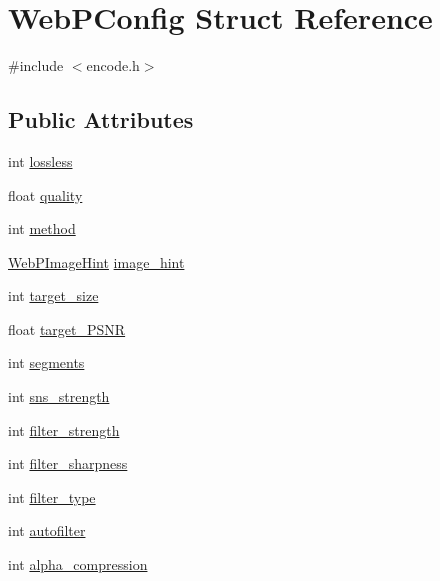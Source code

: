 \hypertarget{struct_web_p_config}{}\section{Web\+P\+Config Struct Reference}
\label{struct_web_p_config}


{\ttfamily \#include $<$encode.\+h$>$}

\subsection*{Public Attributes}
\begin{DoxyCompactItemize}
\item 
int \mbox{\hyperlink{struct_web_p_config_ae76342aafc7e4e4faae98c8b40b4c426}{lossless}}
\item 
float \mbox{\hyperlink{struct_web_p_config_a733ce6ee4f65bd282eaadcbbe2bb1655}{quality}}
\item 
int \mbox{\hyperlink{struct_web_p_config_a9ff89da80dbd10d15f510f3c11b86d50}{method}}
\item 
\mbox{\hyperlink{encode_8h_a1f68d574ed8013982452c9bceab8bab8}{Web\+P\+Image\+Hint}} \mbox{\hyperlink{struct_web_p_config_ae55295c3b9a0dc313cd7eb6c35b613cc}{image\+\_\+hint}}
\item 
int \mbox{\hyperlink{struct_web_p_config_a50b7f213fd062a17f60b7976b4b27e1f}{target\+\_\+size}}
\item 
float \mbox{\hyperlink{struct_web_p_config_ab0f1a8383cb5b3cb6e6b4584fd5a7810}{target\+\_\+\+P\+S\+NR}}
\item 
int \mbox{\hyperlink{struct_web_p_config_af7fa0f65c3e44e92fb26e928cb3e8e8a}{segments}}
\item 
int \mbox{\hyperlink{struct_web_p_config_afd11201753c84bdb5bf7412f1879dd83}{sns\+\_\+strength}}
\item 
int \mbox{\hyperlink{struct_web_p_config_acf68068ef202d50e2ef8d055d38efe8b}{filter\+\_\+strength}}
\item 
int \mbox{\hyperlink{struct_web_p_config_ac51ffb9b9c2931badfb4e18a14c7b5c4}{filter\+\_\+sharpness}}
\item 
int \mbox{\hyperlink{struct_web_p_config_ad6e0e58a9de23dd49a743a8ca95a9562}{filter\+\_\+type}}
\item 
int \mbox{\hyperlink{struct_web_p_config_a4155b355a8af62aa0bef254d94cb70d1}{autofilter}}
\item 
int \mbox{\hyperlink{struct_web_p_config_ab0374897d1c6c0564bb6e07cb6126a79}{alpha\+\_\+compression}}
\item 

\end{DoxyCompactItemize}
